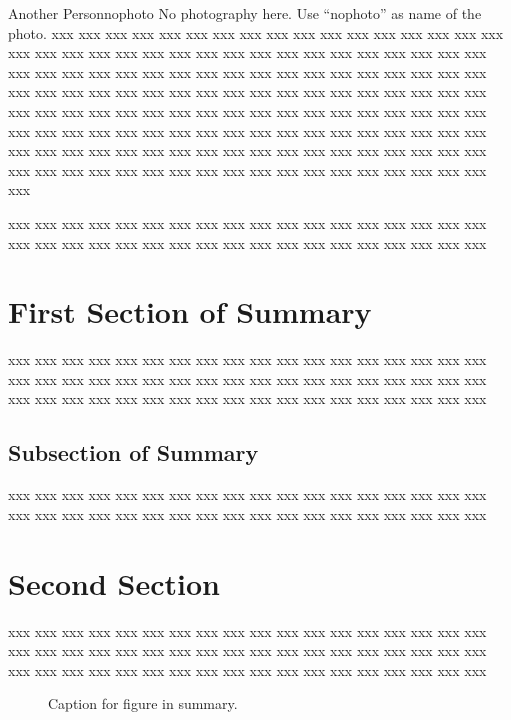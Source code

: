 \documentclass[10pt,twoside%
	]{article}
\begin{document}
\begin{biography}{Another Person}{nophoto}
No photography here. Use ``nophoto'' as name of the photo.
xxx xxx xxx xxx xxx xxx xxx xxx xxx xxx xxx xxx xxx xxx xxx xxx xxx xxx 
xxx xxx xxx xxx xxx xxx xxx xxx xxx xxx xxx xxx xxx xxx xxx xxx xxx xxx 
xxx xxx xxx xxx xxx xxx xxx xxx xxx xxx xxx xxx xxx xxx xxx xxx xxx xxx 
xxx xxx xxx xxx xxx xxx xxx xxx xxx xxx xxx xxx xxx xxx xxx xxx xxx xxx 
xxx xxx xxx xxx xxx xxx xxx xxx xxx xxx xxx xxx xxx xxx xxx xxx xxx xxx 
xxx xxx xxx xxx xxx xxx xxx xxx xxx xxx xxx xxx xxx xxx xxx xxx xxx xxx 
xxx xxx xxx xxx xxx xxx xxx xxx xxx xxx xxx xxx xxx xxx xxx xxx xxx xxx 
xxx xxx xxx xxx xxx xxx xxx xxx xxx xxx xxx xxx xxx xxx xxx xxx xxx xxx 

xxx xxx xxx xxx xxx xxx xxx xxx xxx xxx xxx xxx xxx xxx xxx xxx xxx xxx 
xxx xxx xxx xxx xxx xxx xxx xxx xxx xxx xxx xxx xxx xxx xxx xxx xxx xxx 
\end{biography}



\summary

\section{First Section of Summary}

xxx xxx xxx xxx xxx xxx xxx xxx xxx xxx xxx xxx xxx xxx xxx xxx xxx xxx 
xxx xxx xxx xxx xxx xxx xxx xxx xxx xxx xxx xxx xxx xxx xxx xxx xxx xxx 
xxx xxx xxx xxx xxx xxx xxx xxx xxx xxx xxx xxx xxx xxx xxx xxx xxx xxx 


\subsection{Subsection of Summary}

xxx xxx xxx xxx xxx xxx xxx xxx xxx xxx xxx xxx xxx xxx xxx xxx xxx xxx 
xxx xxx xxx xxx xxx xxx xxx xxx xxx xxx xxx xxx xxx xxx xxx xxx xxx xxx 



\section{Second Section}

xxx xxx xxx xxx xxx xxx xxx xxx xxx xxx xxx xxx xxx xxx xxx xxx xxx xxx 
xxx xxx xxx xxx xxx xxx xxx xxx xxx xxx xxx xxx xxx xxx xxx xxx xxx xxx 
xxx xxx xxx xxx xxx xxx xxx xxx xxx xxx xxx xxx xxx xxx xxx xxx xxx xxx 

\begin{figure}[b]
\caption{Caption for figure in summary.}
\label{f:sfig}
\end{figure}
\end{document}
